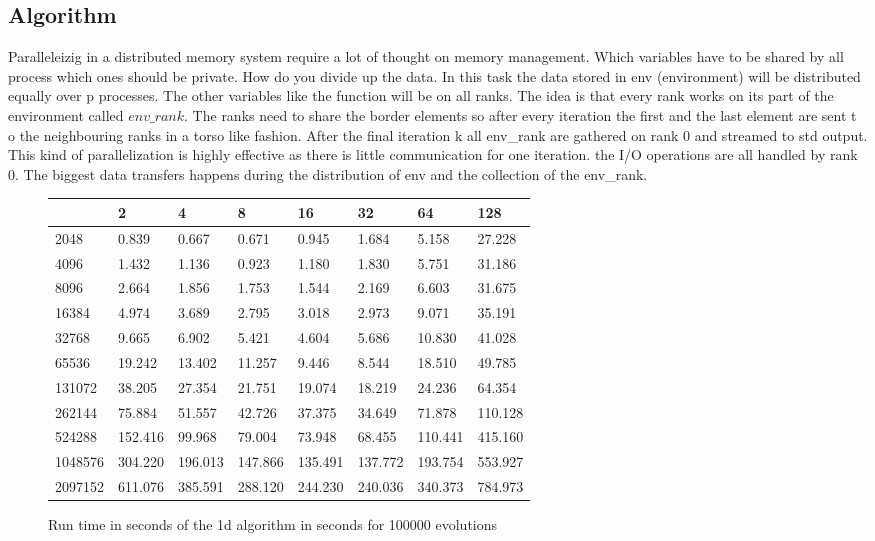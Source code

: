 \documentclass[11pt]{article} %
\begin{document}
\subsection{Algorithm}
Paralleleizig in a distributed memory system require a lot of thought on memory management. Which
variables have to be shared by all process which ones should be private. How do you divide up the
data. In this task the data stored in env (environment) will be distributed equally over p processes.
The other variables like the function will be on all ranks. 
The idea is that every rank works on its part of the environment called $env\_rank$. The ranks need 
to share the border elements so after every iteration the first and the last element are sent t
o the neighbouring ranks in a torso like fashion. After the final iteration k all env\_rank are 
gathered on rank 0 and streamed to std output. 
This kind of parallelization is highly effective as there is little communication for one iteration.
the I/O operations are all handled by rank 0. 
The biggest data transfers happens during the distribution of env and the collection of the
env\_rank.

\begin{figure}
\begin{center}
\begin{tabular}{l|l|l|l|l|l|l|l|}
\hline
        & 2       & 4       & 8       & 16      & 32      & 64      & 128     \\
\hline
2048    & 0.839   & 0.667   & 0.671   & 0.945   & 1.684   & 5.158   & 27.228  \\
\hline
4096    & 1.432   & 1.136   & 0.923   & 1.180   & 1.830   & 5.751   & 31.186  \\
\hline
8096    & 2.664   & 1.856   & 1.753   & 1.544   & 2.169   & 6.603   & 31.675  \\
\hline
16384   & 4.974   & 3.689   & 2.795   & 3.018   & 2.973   & 9.071   & 35.191  \\
\hline
32768   & 9.665   & 6.902   & 5.421   & 4.604   & 5.686   & 10.830  & 41.028  \\
\hline
65536   & 19.242  & 13.402  & 11.257  & 9.446   & 8.544   & 18.510  & 49.785  \\
\hline
131072  & 38.205  & 27.354  & 21.751  & 19.074  & 18.219  & 24.236  & 64.354  \\
\hline
262144  & 75.884  & 51.557  & 42.726  & 37.375  & 34.649  & 71.878  & 110.128 \\
\hline
524288  & 152.416 & 99.968  & 79.004  & 73.948  & 68.455  & 110.441 & 415.160 \\
\hline
1048576 & 304.220 & 196.013 & 147.866 & 135.491 & 137.772 & 193.754 & 553.927 \\
\hline
2097152 & 611.076 & 385.591 & 288.120 & 244.230 & 240.036 & 340.373 & 784.973 \\
\hline
\end{tabular}
\caption{Run time in seconds of the 1d algorithm in seconds for 100000 evolutions}
\end{center}
\end{figure}
\end{document}

